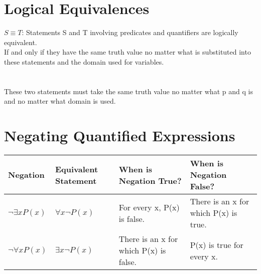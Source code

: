 \documentclass{article}
\begin{document}
\pagebreak
\section{Logical Equivalences}
$S\equiv T$: Statements S and T involving predicates and quantifiers are logically equivalent.\\
\indent If and only if they have the same truth value no matter what is substituted into these statements and the domain used for variables.\\


\\
\\
These two statements must take the same truth value no matter what p and q is and no matter what domain is used.\\

\section{Negating Quantified Expressions}
\begin{center}
\begin{tabular}{ |p{3cm}|p{3cm}|p{3cm}|p{3cm}| }
    \hline
    Negation & Equivalent Statement & When is Negation True? & When is Negation False?\\
    \hline
    $\neg \exists xP(x)$ & $\forall x\neg P(x)$ & For every x, P(x) is false. & There is an x for which P(x) is true.\\
    \hline
    $\neg \forall xP(x)$ & $\exists x\neg P(x)$ & There is an x for which P(x) is false. & P(x) is true for every x.\\
    \hline
\end{tabular}
\end{center}
\end{document}
